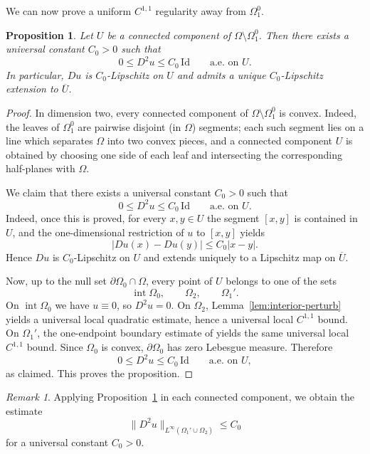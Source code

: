\documentclass[reqno,11pt]{amsart}
\makeatletter
\newtheorem{prop}[thm]{Proposition}%
\numberwithin{equation}{section}
\theoremstyle{remark}
\newtheorem{rem}[thm]{Remark}%
\makeatother
\begin{document}
We can now prove a uniform $C^{1,1}$ regularity away from $\Omega_1^0$.

\begin{prop}\label{prop:goodC11}
Let $U$ be a connected component of $\Omega\setminus \Omega_1^0$.
Then there exists a universal constant $C_0>0$ such that
\[
0\le D^2u\le C_0\,\mathrm{Id}
\qquad\text{a.e.\ on }U.
\]
In particular, $Du$ is $C_0$-Lipschitz on $U$ and admits a unique $C_0$-Lipschitz extension to $\overline U$.

\end{prop}

\begin{proof}
In dimension two, every connected component of
$\Omega\setminus\Omega_1^0$ is convex. Indeed, the leaves of $\Omega_1^0$ are
pairwise disjoint (in $\Omega$) segments; each such segment lies on a line which separates
$\Omega$ into two convex pieces, and a connected component $U$ is obtained by
choosing one side of each leaf and intersecting the corresponding half-planes
with $\Omega$.

We claim that there exists a universal constant $C_0>0$ such that
\[
0\le D^2u\le C_0\,\mathrm{Id}
\qquad\text{a.e.\ on }U.
\]
Indeed, once this is proved, for every $x,y\in U$ the segment $[x,y]$ is
contained in $U$, and the one-dimensional restriction of $u$ to $[x,y]$
yields
\[
|Du(x)-Du(y)|\le C_0|x-y|.
\]
Hence $Du$ is $C_0$-Lipschitz on $U$ and extends uniquely to a Lipschitz map on
$\overline U$.

Now, up to the null set $\partial\Omega_0\cap\Omega$, every point of $U$
belongs to one of the sets
\[
\operatorname{int}\Omega_0,\qquad \Omega_2,\qquad \Omega_1'.
\]
On $\operatorname{int}\Omega_0$ we have $u\equiv 0$, so $D^2u=0$. On $\Omega_2$,
Lemma~\ref{lem:interior-perturb} yields a universal local quadratic estimate,
hence a universal local $C^{1,1}$ bound. On $\Omega_1'$, the one-endpoint
boundary estimate of \cite[Theorem~4.1]{MRZ20252} yields the same universal
local $C^{1,1}$ bound. Since $\Omega_0$ is convex, $\partial\Omega_0$ has zero
Lebesgue measure. Therefore
\[
0\le D^2u\le C_0\,\mathrm{Id}
\qquad\text{a.e.\ on }U,
\]
as claimed.
This proves the proposition.
\end{proof}

\begin{rem}\label{rem:goodC11}
Applying Proposition~\ref{prop:goodC11} in each connected component, we obtain the estimate
\begin{equation}\label{c11good-rmk}
\|D^2u\|_{L^\infty(\Omega_1'\cup\Omega_2)}\le C_0
\end{equation}
for a universal constant $C_0>0$.
\end{rem}
\end{document}
